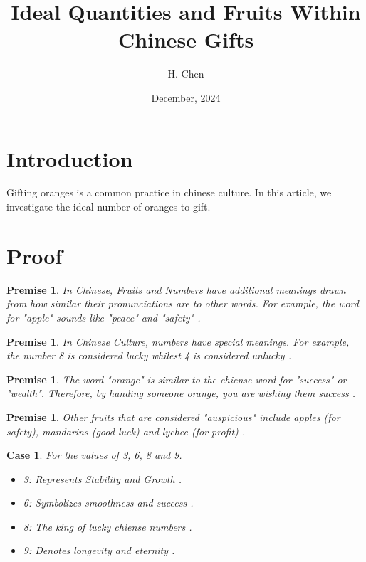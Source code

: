\documentclass[10pt,a4paper]{article}
\newtheorem{premise}[theorem]{Premise}
\newtheorem{case}[theorem]{Case}
\begin{document}
\title{Ideal Quantities and Fruits Within Chinese Gifts}
\author{H. Chen}
\date{December, 2024}
\maketitle

\section{Introduction}
Gifting oranges is a common practice in chinese culture. In this article, we investigate the ideal number of oranges to gift.

\section{Proof}
\begin{premise}
    In Chinese, Fruits and Numbers have additional meanings drawn from how similar their pronunciations are to other words. For example, the word for "apple" sounds like "peace" and "safety" \citep{wiki:chinese-numerology}.
\end{premise}

\begin{premise}
    In Chinese Culture, numbers have special meanings. For example, the number 8 is considered lucky whilest 4 is considered unlucky \citep{wiki:chinese-numerology}.
\end{premise}

\begin{premise}
    The word "orange" is similar to the chiense word for "success" or "wealth". Therefore, by handing someone orange, you are wishing them success \citep{chow2020}.
\end{premise}

\begin{premise}
    Other fruits that are considered "auspicious" include apples (for safety), mandarins (good luck) and lychee (for profit) \citep{blog:ewe2024}.
\end{premise}

\begin{case}
    For the values of 3, 6, 8 and 9.

    \begin{itemize}
        \item 3: Represents Stability and Growth \citep{wiki:chinese-numerology}. 
        \item 6: Symbolizes smoothness and success \citep{wiki:chinese-numerology}.
        \item 8: The king of lucky chiense numbers \citep{wiki:chinese-numerology}.
        \item 9: Denotes longevity and eternity \citep{wiki:chinese-numerology}.
    \end{itemize}

\end{case}
\end{document}
